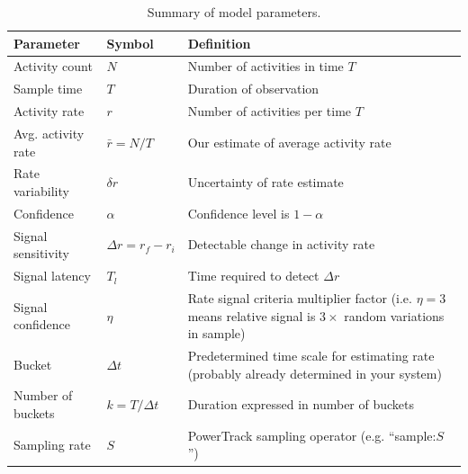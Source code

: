 \documentclass{article}
\begin{document}
\begin{table} [!h]
    \begin{tabular}{p{3.0cm}| p{1.9cm}|p{5.9cm}}
     \hline
Parameter  & Symbol & Definition \\
\hline	
Activity count & $N$ & Number of activities in time $T$\\
Sample time & $T$	& Duration of observation\\
Activity rate & $r$	& Number of activities per time $T$\\
Avg. activity rate & $\bar{r} = N/T$ & Our estimate of average activity rate \\
Rate variability & $\delta r$	& Uncertainty of rate estimate \\
Confidence & $\alpha$ & Confidence level is $1-\alpha$\\
Signal sensitivity & $\Delta r=r_{f}-r_{i}$ & Detectable change in activity rate \\
Signal latency & $T_l$ & Time required to detect $\Delta r$  \\
Signal confidence & $\eta$ & Rate signal criteria multiplier factor (i.e. $\eta = 3$ means relative signal is $3 \times$ random variations in sample) \\
Bucket & $\Delta t$ & Predetermined time scale for estimating rate (probably already determined in your system)\\
Number of buckets & $k=T/\Delta t$ & Duration expressed in number of  buckets \\
Sampling rate & $S$	& PowerTrack sampling operator (e.g. ``sample:$S$'') \\
\hline
\end{tabular}
\caption{Summary of model parameters.}
\label{tab:summary}
\end{table}
\end{document}
